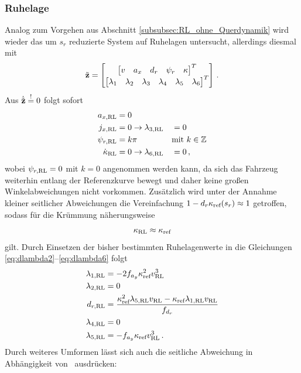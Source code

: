 \subsubsection{Ruhelage}\label{subsubsec:Ruhelage_Kreisfahrt_mit_Querdynamik}
Analog zum Vorgehen aus Abschnitt \ref{subsubsec:RL_ohne_Querdynamik} wird wieder das um $s_r$ reduzierte System auf Ruhelagen untersucht, allerdings diesmal mit
\begin{equation}
\tilde{\boldsymbol{\mathrm{z}}} = 
\begin{bmatrix}
\begin{bmatrix}
v & a_x & d_r & \psi_r & \kappa
\end{bmatrix}^T\\
\begin{bmatrix}
\lambda_1 & \lambda_2 & \lambda_3 & \lambda_4 & \lambda_5 & \lambda_6
\end{bmatrix}^T
\end{bmatrix}\,.
\end{equation}
Aus $\dot{\tilde{\boldsymbol{\mathrm{z}}}} \stackrel{!}{=} 0$ folgt sofort 
\begin{alignat}{2}
	a_{x,\textrm{RL}} &= 0 &&\\
	j_{x,\textrm{RL}} &= 0 \rightarrow \lambda_{3,\textrm{RL}} &&= 0\\
	\psi_{r,\textrm{RL}} &= k\pi&&\textrm{mit}~k\in\mathbb{Z}\\
	\dot{\kappa}_{\textrm{RL}} &= 0 \rightarrow \lambda_{6,\textrm{RL}} &&= 0\,,
\end{alignat}
wobei $\psi_{r,\textrm{RL}}=0$ mit $k=0$ angenommen werden kann, da sich das Fahrzeug weiterhin entlang der Referenzkurve bewegt und daher keine großen Winkelabweichungen nicht vorkommen. Zusätzlich wird unter der Annahme kleiner seitlicher Abweichungen die Vereinfachung $1-d_r\kappa_{\textrm{ref}}(s_r)\approx 1$ getroffen, sodass für die Krümmung näherungsweise 
\begin{equation}
	\kappa_{\textrm{RL}} \approx \kappa_{\textrm{ref}} \label{eq:kappaRL_approx_kapparef}
\end{equation}
gilt. Durch Einsetzen der bisher bestimmten Ruhelagenwerte in die Gleichungen \eqref{eq:dlambda2}--\eqref{eq:dlambda6} folgt 
\begin{align}
	\lambda_{1,\textrm{RL}} &= -2f_{a_y}\kappa_{\textrm{ref}}^2v_{\textrm{RL}}^3\\
	\lambda_{2,\textrm{RL}} &= 0\\
	d_{r,\textrm{RL}} &= \frac{\kappa_{\textrm{ref}}^2\lambda_{5,\textrm{RL}} v_{\textrm{RL}}-\kappa_{\textrm{ref}}\lambda_{1,\textrm{RL}}v_{\textrm{RL}}}{f_{d_r}} \label{eq:dr_RL}\\
	\lambda_{4,\textrm{RL}} &= 0\\
	\lambda_{5,\textrm{RL}} &= -f_{a_y}\kappa_{\textrm{ref}} v_{\textrm{RL}}^3\,.
\end{align}
Durch weiteres Umformen lässt sich auch die seitliche Abweichung in Abhängigkeit von \vRL~ausdrücken:
